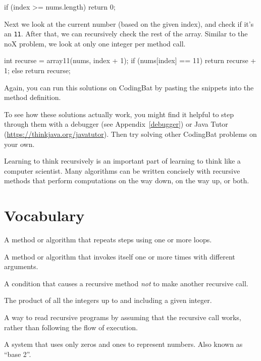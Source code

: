 \begin{code}
    if (index >= nums.length) {
        return 0;
    }
\end{code}

Next we look at the current number (based on the given index), and check if it's an {\tt 11}.
After that, we can recursively check the rest of the array.
Similar to the noX problem, we look at only one integer per method call.

\begin{code}
    int recurse = array11(nums, index + 1);
    if (nums[index] == 11) {
        return recurse + 1;
    } else {
        return recurse;
    }
\end{code}

Again, you can run this solutions on CodingBat by pasting the snippets into the method definition.



To see how these solutions actually work, you might find it helpful to step through them with a debugger (see Appendix~\ref{debugger}) or Java Tutor (\url{https://thinkjava.org/javatutor}).
Then try solving other CodingBat problems on your own.

Learning to think recursively is an important part of learning to think like a computer scientist.
Many algorithms can be written concisely with recursive methods that perform computations on the way down, on the way up, or both.


\section{Vocabulary}

\begin{description}



A method or algorithm that repeats steps using one or more loops.

A method or algorithm that invokes itself one or more times with different arguments.


A condition that causes a recursive method {\em not} to make another recursive call.


The product of all the integers up to and including a given integer.

A way to read recursive programs by assuming that the recursive call works, rather than following the flow of execution.

A system that uses only zeros and ones to represent numbers.
Also known as ``base 2''.

\end{description}


